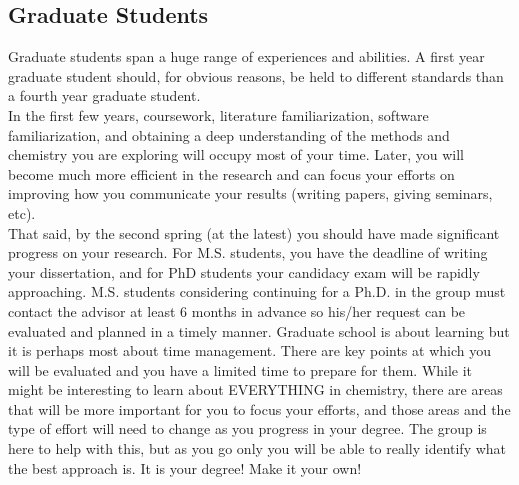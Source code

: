 \documentclass[letterpaper]{article}
\begin{document}
\subsection*{Graduate Students}
Graduate students span a huge range of experiences and abilities. A first year graduate student should, for obvious reasons, be held to different standards than a fourth year graduate student.\\

In the first few years, coursework, literature familiarization, software familiarization, and obtaining a deep understanding of the methods and chemistry you are exploring will occupy most of your time. Later, you will become much more efficient in the research and can focus your efforts on improving how you communicate your results (writing papers, giving seminars, etc). \\

That said, by the second spring (at the latest) you should have made significant progress on your research. For M.S. students, you have the deadline of writing your dissertation, and for PhD students your candidacy exam will be rapidly approaching. M.S. students considering continuing for a Ph.D. in the group must contact the advisor at least 6 months in advance so his/her request can be evaluated and planned in a timely manner. Graduate school is about learning but it is perhaps most about time management.  There are key points at which you will be evaluated and you have a limited time to prepare for them. While it might be interesting to learn about EVERYTHING in chemistry, there are areas that will be more important for you to focus your efforts, and those areas and the type of effort will need to change as you progress in your degree. The group is here to help with this, but as you go only you will be able to really identify what the best approach is. It is your degree! Make it your own!
\end{document}
